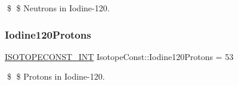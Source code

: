 \$ \$ Neutrons in Iodine-\/120. \mbox{\label{group___isotope_const-_iodine-_i120_ga8e06869a2bfebe6c780abdd815a1ebb3}} 
\subsubsection{\texorpdfstring{Iodine120\+Protons}{Iodine120Protons}}
{\footnotesize\ttfamily \mbox{\hyperlink{group___isotope_const-_macros_ga5f18360b3e99483a35c32d789e62621c}{I\+S\+O\+T\+O\+P\+E\+C\+O\+N\+S\+T\+\_\+\+I\+NT}} Isotope\+Const\+::\+Iodine120\+Protons = 53}

\$ \$ Protons in Iodine-\/120. 